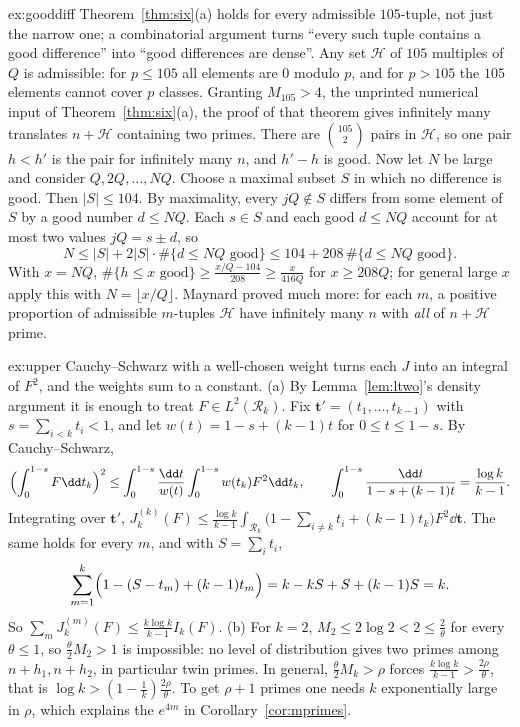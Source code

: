 \begin{solution}{ex:gooddiff}
\idea Theorem~\ref{thm:six}(a) holds for every admissible $105$-tuple, not just the narrow one; a combinatorial argument turns ``every such tuple contains a good difference'' into ``good differences are dense''.
\writeup Any set $\mathcal H$ of $105$ multiples of $Q$ is admissible: for $p\le105$ all elements are $0$ modulo $p$, and for $p>105$ the $105$ elements cannot cover $p$ classes. Granting $M_{105}>4$, the unprinted numerical input of Theorem~\ref{thm:six}(a), the proof of that theorem gives infinitely many translates $n+\mathcal H$ containing two primes. There are $\binom{105}2$ pairs in $\mathcal H$, so one pair $h<h'$ is the pair for infinitely many $n$, and $h'-h$ is good.
Now let $N$ be large and consider $Q,2Q,\dots,NQ$. Choose a maximal subset $S$ in which no difference is good. Then $|S|\le104$. By maximality, every $jQ\notin S$ differs from some element of $S$ by a good number $d\le NQ$. Each $s\in S$ and each good $d\le NQ$ account for at most two values $jQ=s\pm d$, so
\[
N\le|S|+2|S|\cdot\#\{d\le NQ\text{ good}\}\le104+208\,\#\{d\le NQ\text{ good}\}.
\]
With $x=NQ$, $\#\{h\le x\text{ good}\}\ge\frac{x/Q-104}{208}\ge\frac x{416Q}$ for $x\ge208Q$; for general large $x$ apply this with $N=\lfloor x/Q\rfloor$. Maynard proved much more: for each $m$, a positive proportion of admissible $m$-tuples $\mathcal H$ have infinitely many $n$ with \emph{all} of $n+\mathcal H$ prime.
\end{solution}

\begin{solution}{ex:upper}
\idea Cauchy--Schwarz with a well-chosen weight turns each $J$ into an integral of $F^2$, and the weights sum to a constant.
\writeup (a) By Lemma~\ref{lem:ltwo}'s density argument it is enough to treat $F\in L^2(\mathcal R_k)$. Fix $\mathbf t'=(t_1,\dots,t_{k-1})$ with $s=\sum_{i<k}t_i<1$, and let $w(t)=1-s+(k-1)t$ for $0\le t\le1-s$. By Cauchy--Schwarz,
\[
\Bigl(\int_0^{1-s}F\dd t_k\Bigr)^2\le\int_0^{1-s}\frac{\dd t}{w(t)}\int_0^{1-s}w(t_k)F^2\dd t_k,\qquad\int_0^{1-s}\frac{\dd t}{1-s+(k-1)t}=\frac{\log k}{k-1}.
\]
Integrating over $\mathbf t'$, $J_k^{(k)}(F)\le\frac{\log k}{k-1}\int_{\mathcal R_k}\bigl(1-\sum_{i\ne k}t_i+(k-1)t_k\bigr)F^2\dd\mathbf t$. The same holds for every $m$, and with $S=\sum_it_i$,
\[
\sum_{m=1}^k\Bigl(1-(S-t_m)+(k-1)t_m\Bigr)=k-kS+S+(k-1)S=k.
\]
So $\sum_mJ_k^{(m)}(F)\le\frac{k\log k}{k-1}I_k(F)$.
(b) For $k=2$, $M_2\le2\log2<2\le\frac2\theta$ for every $\theta\le1$, so $\frac\theta2M_2>1$ is impossible: no level of distribution gives two primes among $n+h_1,n+h_2$, in particular twin primes. In general, $\frac\theta2M_k>\rho$ forces $\frac{k\log k}{k-1}>\frac{2\rho}\theta$, that is $\log k>(1-\frac1k)\frac{2\rho}\theta$. To get $\rho+1$ primes one needs $k$ exponentially large in $\rho$, which explains the $e^{4m}$ in Corollary~\ref{cor:mprimes}.
\end{solution}

